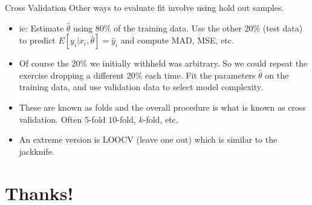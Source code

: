 \documentclass[aspectratio=169]{beamer}
\begin{document}
\begin{frame}{Cross Validation}
Other ways to evaluate fit involve using \alert{hold out} samples. 
\begin{itemize}
\item ie: Estimate $\hat{\theta}$ using 80\% of the \alert{training} data. Use the other 20\% (\alert{test data}) to predict $E[y_i | x_i, \widehat{\theta}]=\hat{y}_i$ and compute MAD, MSE, etc.
\item Of course the 20\% we initially withheld was arbitrary. So we could repeat the exercise dropping a different 20\% each time. Fit the parameters $\widehat{\theta}$ on the training data, and use \alert{validation data} to select model complexity.
\item These are known as \alert{folds} and the overall procedure is what is known as \alert{cross validation}. Often $5$-fold $10$-fold, $k$-fold, etc.
\item An extreme version is LOOCV (leave one out) which is similar to the jackknife.
\end{itemize}
\end{frame}



\section*{Thanks!}
\end{document}
